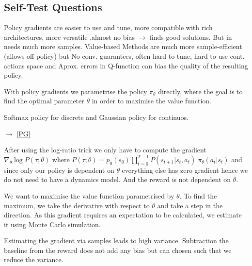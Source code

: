\subsection{Self-Test Questions}
 \begin{enumerate}
\newline Policy gradients are easier to use and tune, more compatible with rich architectures, more versatile ,almost no bias $\rightarrow$ finds good solutions. But in needs much more samples. Value-based Methods are much more sample-efficient (allows off-policy) but No conv. guarantees, often hard to tune, hard to use cont. actions space and Aprox. errors in Q-function can bias the quality of the resulting policy.

 \newline With
policy gradients we parametrise the policy $\pi_\theta$ directly, where the goal is to find the optimal parameter $\theta$ in order to maximise the value function.

\newline Softmax policy for discrete and Gaussian policy for continuos.

 $\rightarrow$ \ref{PG}

 \newline After using the log-ratio trick we only have to compute the gradient $ \nabla_{\theta} \log{P(\tau;\theta)}$ where $P(\tau;\theta)=p_0(s_0) 
\prod_{t=0}^{T-1} P(s_{t+1}|s_t,a_t)\;\pi_{\theta}(a_t|s_t)$ and since only our policy is dependent on $\theta$ everything else has zero gradient hence we do not need to have a dynamics model. And the reward is not dependent on $\theta$.

\newline We want to 
maximise the value function parametrised by $\theta$. To find the maximum, we take 
the derivative with respect to $\theta$ and take a step in the direction. As this 
gradient requires an expectation to be calculated, we estimate it using Monte Carlo 
simulation.


\newline
Estimating the gradient via samples leads to high variance. Subtraction the baseline
from the reward does not add any bias but can chosen such that we reduce the variance.


\end{enumerate}

